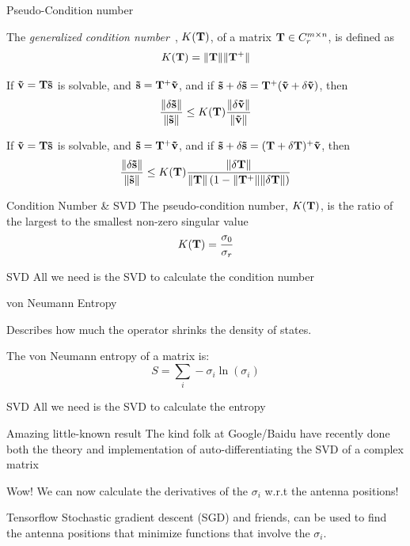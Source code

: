 \documentclass[ignorenonframetext]{beamer}
\begin{document}
 
\begin{frame}{Pseudo-Condition number}

The {\em generalized condition number}~\cite{stanimirovic2001}, $K(\mathbf{T})$, of a matrix $\mathbf{T} \in C^{m \times n}_r$, is defined as
 \[ K(\mathbf{T}) = \lVert \mathbf{T} \rVert \lVert \mathbf{T}^+ \rVert \]

\begin{theorem}
If $\mathbf{\vec{v}} = \mathbf{T} \mathbf{\vec{s}}$ is solvable, and $\mathbf{\vec{s}} = \mathbf{T}^+ \mathbf{\vec{v}}$, and if $\mathbf{\vec{s}} + \delta \mathbf{\vec{s}} = \mathbf{T}^+( \mathbf{\vec{v}}+ \delta \mathbf{\vec{v}})$, then
 \[ \frac{\lVert \delta \mathbf{\vec{s}} \rVert}{\lVert \mathbf{\vec{s}} \rVert} \leq K(\mathbf{T}) \frac{\lVert \delta \mathbf{\vec{v}} \rVert}{\lVert \mathbf{\vec{v}} \rVert} \]
 \end{theorem}

 \begin{theorem}
If $\mathbf{\vec{v}} = \mathbf{T} \mathbf{\vec{s}}$ is solvable, and $\mathbf{\vec{s}} = \mathbf{T}^+ \mathbf{\vec{v}}$, and if $\mathbf{\vec{s}} + \delta \mathbf{\vec{s}} = (\mathbf{T} + \delta \mathbf{T})^+\mathbf{\vec{v}}$, then
 \[ \frac{\lVert \delta \mathbf{\vec{s}} \rVert}{\lVert \mathbf{\vec{s}} \rVert} \leq K(\mathbf{T}) \frac{\lVert \delta \mathbf{T} \rVert}{\lVert \mathbf{T} \rVert \left(1 - \lVert \mathbf{T}^+ \rVert \lVert \delta \mathbf{T} \rVert \right)} \]
 \end{theorem} 
\end{frame}

\begin{frame}{Condition Number \& SVD}
The pseudo-condition number, $K(\mathbf{T})$, is the ratio of the largest to the smallest non-zero singular value
 \[ K(\mathbf{T}) = \frac{\sigma_0}{\sigma_r} \]
 \begin{block}{SVD}
All we need is the SVD to calculate the condition number
 \end{block}
 \end{frame}

\begin{frame}{von Neumann Entropy}

Describes how much the operator shrinks the density of states.

The von Neumann entropy of a matrix is:
  \[ S = \sum_i -\sigma_i \ln(\sigma_i) \]
 \begin{block}{SVD}
All we need is the SVD to calculate the entropy
 \end{block}
 \end{frame}


\begin{frame}{Amazing little-known result} 
 The kind folk at Google/Baidu have recently done both the theory and implementation of auto-differentiating the SVD of a complex matrix 
 
 \begin{block}{Wow!}
 We can now calculate the derivatives of the $\sigma_i$ w.r.t the antenna positions!
 \end{block}
\pause
 \begin{block}{Tensorflow}
 Stochastic gradient descent (SGD) and friends, can be used to find the antenna positions that minimize functions that involve the $\sigma_i$.
 \end{block}

\end{frame}
\end{document}

